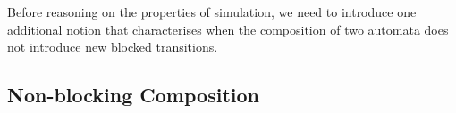 \documentclass[runningheads]{llncs}
\begin{document}
Before reasoning on the properties of simulation, we need to introduce one additional notion that characterises when the composition of two automata does not introduce new blocked transitions.

\subsection{Non-blocking Composition}

\end{document}
